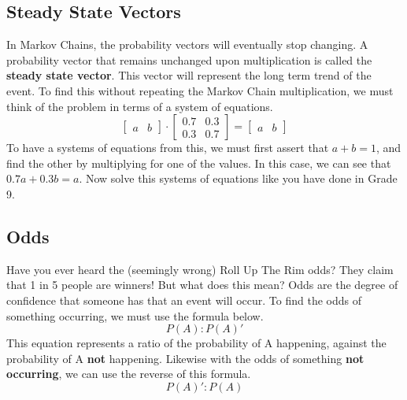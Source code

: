 \documentclass[final,1p,12pt]{elsarticle}
\begin{document}
    \subsection{Steady State Vectors}
    In Markov Chains, the probability vectors will eventually stop changing.
    A probability vector that remains unchanged upon multiplication is called the \textbf{steady state vector}.
    This vector will represent the long term trend of the event.
    To find this without repeating the Markov Chain multiplication, we must think of the problem in terms of a system of equations.
    \begin{equation*}
        \begin{bmatrix}
            a & b
        \end{bmatrix}
        \cdot
        \begin{bmatrix}
            0.7 & 0.3\\
            0.3 & 0.7
        \end{bmatrix}
        =
        \begin{bmatrix}
            a & b
        \end{bmatrix}
    \end{equation*}
    To have a systems of equations from this, we must first assert that $a + b = 1$, and find the other by multiplying for one of the values.
    In this case, we can see that $0.7a + 0.3b = a$.
    Now solve this systems of equations like you have done in Grade 9.
    
    \subsection{Odds}
    Have you ever heard the (seemingly wrong) Roll Up The Rim odds?
    They claim that 1 in 5 people are winners!
    But what does this mean?
    Odds are the degree of confidence that someone has that an event will occur.
    To find the odds of something occurring, we must use the formula below.
    \begin{equation*}
        P(A) : P(A)' 
    \end{equation*}
    This equation represents a ratio of the probability of A happening, against the probability of A \textbf{not} happening. Likewise with the odds of something \textbf{not occurring}, we can use the reverse of this formula.
    \begin{equation*}
        P(A)' : P(A)
    \end{equation*}
    
\clearpage\appendix

\end{document}
